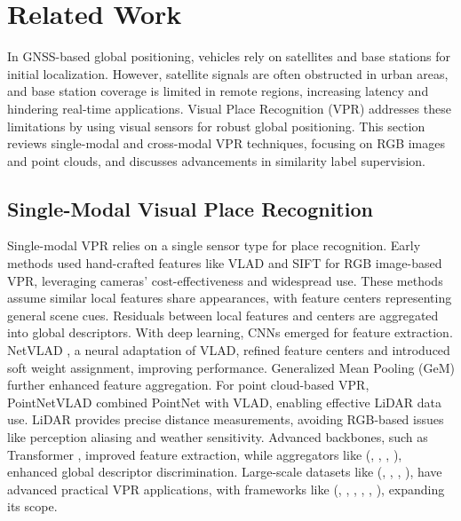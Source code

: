 \section{Related Work}
In GNSS-based global positioning, vehicles rely on satellites and base stations for initial localization. However, satellite signals are often obstructed in urban areas, and base station coverage is limited in remote regions, increasing latency and hindering real-time applications. Visual Place Recognition (VPR) addresses these limitations by using visual sensors for robust global positioning. This section reviews single-modal and cross-modal VPR techniques, focusing on RGB images and point clouds, and discusses advancements in similarity label supervision.

\subsection{Single-Modal Visual Place Recognition}
Single-modal VPR relies on a single sensor type for place recognition. Early methods used hand-crafted features like VLAD \cite{jegou2010aggregating} and SIFT \cite{lowe1999object} for RGB image-based VPR, leveraging cameras' cost-effectiveness and widespread use. These methods assume similar local features share appearances, with feature centers representing general scene cues. Residuals between local features and centers are aggregated into global descriptors. With deep learning, CNNs emerged for feature extraction. NetVLAD \cite{arandjelovic2016netvlad}, a neural adaptation of VLAD, refined feature centers and introduced soft weight assignment, improving performance. Generalized Mean Pooling (GeM) \cite{radenovic2018fine} further enhanced feature aggregation. For point cloud-based VPR, PointNetVLAD \cite{uy2018pointnetvlad} combined PointNet \cite{qi2017pointnet} with VLAD, enabling effective LiDAR data use. LiDAR provides precise distance measurements, avoiding RGB-based issues like perception aliasing and weather sensitivity. Advanced backbones, such as Transformer \cite{waswani2017attention}, improved feature extraction, while aggregators like (\cite{izquierdo2024optimal}, \cite{lu2024supervlad}, \cite{khaliq2024vlad}, \cite{ali2024boq}), enhanced global descriptor discrimination. Large-scale datasets like (\cite{warburg2020mapillary}, \cite{berton2022rethinking}, \cite{ali2022gsv}, \cite{alibeigi2023zenseact}), have advanced practical VPR applications, with frameworks like (\cite{berton2025meshvpr}, \cite{berton2024earthloc}, \cite{kolmet2022text2pos}, \cite{keetha2023anyloc}, \cite{vivanco2024geoclip}, \cite{xu2024addressclip}), expanding its scope.

